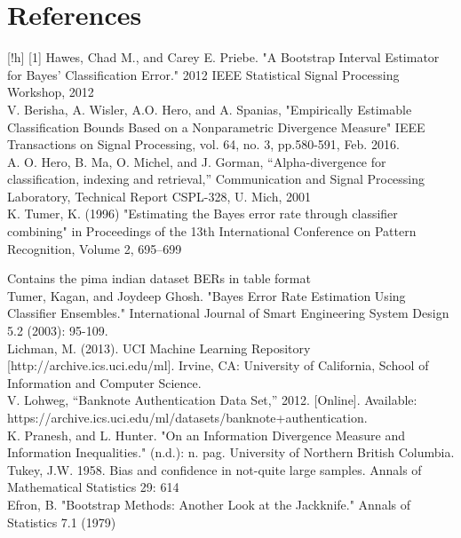\documentclass{article}
\begin{document}
	\section*{References}[!h]
	[1] Hawes, Chad M., and Carey E. Priebe. "A Bootstrap Interval Estimator for Bayes' Classification Error." 2012 IEEE Statistical Signal Processing Workshop, 2012
	\\ [0.5ex]
	\noindent[2] V. Berisha, A. Wisler, A.O. Hero, and A. Spanias, "Empirically Estimable Classification Bounds Based on a Nonparametric Divergence Measure" IEEE Transactions on Signal Processing, vol. 64, no. 3, pp.580-591, Feb. 2016.
	\\ [0.5ex]
	\noindent[3] A. O. Hero, B. Ma, O. Michel, and J. Gorman, “Alpha-divergence for classification, indexing and retrieval,” Communication and Signal Processing Laboratory, Technical Report CSPL-328, U. Mich, 2001
	\\ [0.5ex]
	\noindent [4] K. Tumer, K. (1996) "Estimating the Bayes error rate through classifier combining" in Proceedings of the 13th International Conference on Pattern Recognition, Volume 2, 695–699
	
	Contains the pima indian dataset BERs in table format
	\\ [0.5ex]
	\noindent[5] Tumer, Kagan, and Joydeep Ghosh. "Bayes Error Rate Estimation Using Classifier Ensembles." International Journal of Smart Engineering System Design 5.2 (2003): 95-109.
	\\ [0.5ex]
	
	\noindent[6] Lichman, M. (2013). UCI Machine Learning Repository [http://archive.ics.uci.edu/ml]. Irvine, CA: University of California, School of Information and Computer Science.
	\\ [0.5ex]
	
	\noindent [7] V. Lohweg, “Banknote Authentication Data Set,” 2012. [Online]. Available: https://archive.ics.uci.edu/ml/datasets/banknote+authentication.
	\\ [0.5ex]
	
	\noindent [8] K. Pranesh, and L. Hunter. "On an Information Divergence Measure and Information Inequalities." (n.d.): n. pag. University of Northern British Columbia. 
	\\ [0.5ex]
	
	\noindent [9] Tukey, J.W. 1958. Bias and confidence in not-quite large samples. Annals of Mathematical Statistics 29: 614
	\\ [0.5ex]
	\noindent [10]Efron, B. "Bootstrap Methods: Another Look at the Jackknife." Annals of Statistics 7.1 (1979)
	\\ [0.5ex]
	
\end{document}
